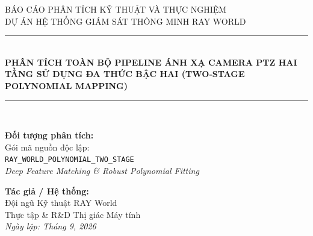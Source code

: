 \documentclass[11pt,a4paper]{article}
\begin{document}
\begin{titlepage}
    \begin{center}
        \vspace*{0.8cm}
        
        \textsc{\Large BÁO CÁO PHÂN TÍCH KỸ THUẬT VÀ THỰC NGHIỆM}\\[0.4cm]
        \textsc{\large DỰ ÁN HỆ THỐNG GIÁM SÁT THÔNG MINH RAY WORLD}\\[1.2cm]
        
        \rule{\linewidth}{1.2pt}\\[0.5cm]
        {\huge\bfseries\color{brandblue} PHÂN TÍCH TOÀN BỘ PIPELINE ÁNH XẠ CAMERA PTZ HAI TẦNG SỬ DỤNG ĐA THỨC BẬC HAI (TWO-STAGE POLYNOMIAL MAPPING)}\\[0.3cm]
        \rule{\linewidth}{1.2pt}\\[1.5cm]
        
        \begin{minipage}{0.48\textwidth}
            \begin{flushleft} \large
                \textbf{Đối tượng phân tích:}\\
                Gói mã nguồn độc lập:\\
                \texttt{RAY\_WORLD\_POLYNOMIAL\_TWO\_STAGE}\\
                \textit{Deep Feature Matching \& Robust Polynomial Fitting}
            \end{flushleft}
        \end{minipage}
        \hfill
        \begin{minipage}{0.48\textwidth}
            \begin{flushright} \large
                \textbf{Tác giả / Hệ thống:}\\
                Đội ngũ Kỹ thuật RAY World\\
                Thực tập \& R\&D Thị giác Máy tính\\
                \textit{Ngày lập: Tháng 9, 2026}
            \end{flushright}
        \end{minipage}
        
        \vfill
        
        \begin{abstract}
        Báo cáo này cung cấp cái nhìn toàn diện và sâu sắc về cấu trúc, cơ sở toán học, quy trình thực thi và hiệu quả thực nghiệm của pipeline \textbf{\texttt{RAY\_WORLD\_POLYNOMIAL\_TWO\_STAGE}}. Đây là kiến trúc ánh xạ điều khiển hai camera (Dual-Camera Calibration: Wide-PTZ) tiên tiến, loại bỏ hoàn toàn các giả định quang học phẳng truyền thống (Planar Homography) vốn tạo ra sai số lớn khi camera góc rộng bị méo hình học hoặc khi camera PTZ xoay trên tọa độ cầu. Bằng cách kết hợp trích xuất đặc trưng học sâu (\textbf{ALIKED} + \textbf{LightGlue} + \textbf{MAGSAC RANSAC}), mô hình \textbf{Đa thức Hai tầng (Two-Stage Robust Polynomial)} và bề mặt nội suy pose \textbf{2-D PCHIP}, hệ thống đạt độ chính xác điều khiển vượt bậc: giảm sai số vị trí lưới $48.3\%$ và giảm sai số góc quay Pan/Tilt thực tế lên tới $64.2\%$ so với baseline Homography truyền thống.
        \end{abstract}
        

\end{center}
\end{titlepage}
\end{document}
